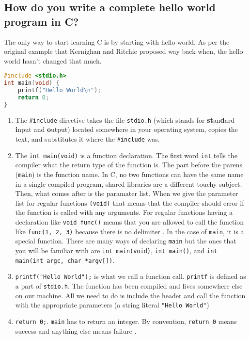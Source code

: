 \subsection{How do you write a complete hello world program in
C?}\label{how-do-you-write-a-complete-hello-world-program-in-c}

The only way to start learning C is by starting with hello world. As per the original example that Kernighan and Ritchie proposed way back when, the hello world hasn't changed that much.

\begin{lstlisting}[language=C]
#include <stdio.h>
int main(void) { 
    printf("Hello World\n");
    return 0; 
}
\end{lstlisting}

\begin{enumerate}
  \item The \texttt{\#include} directive takes the file \texttt{stdio.h} (which stands for \textbf{st}an\textbf{d}ard \textbf{i}nput and \textbf{o}utput) located somewhere in your operating system, copies the text, and substitutes it where the \texttt{\#include} was.
  \item The \texttt{int main(void)} is a function declaration. The first word \texttt{int} tells the compiler what the return type of the function is. The part before the parens (\texttt{main}) is the function name. In C, no two functions can have the same name in a single compiled program, shared libraries are a different touchy subject. Then, what comes after is the paramater list. When we give the parameter list for regular functions \texttt{(void)} that means that the compiler should error if the function is called with any arguments. For regular functions having a declaration like \texttt{void func()} means that you are allowed to call the function like \texttt{func(1, 2, 3)} because there is no delimiter \cite{CITATION_NEEDED}. In the case of \texttt{main}, it is a special function. There are many ways of declaring \texttt{main} but the ones that you will be familiar with are \texttt{int main(void)}, \texttt{int main()}, and \texttt{int main(int argc, char *argv[])}.
  \item \texttt{printf("Hello World\n");} is what we call a function call. \texttt{printf} is defined as a part of \texttt{stdio.h}. The function has been compiled and lives somewhere else on our machine. All we need to do is include the header and call the function with the appropriate parameters (a string literal \texttt{"Hello World\n"})
  \item \texttt{return 0;}. \texttt{main} has to return an integer. By convention, \texttt{return 0} means success and anything else means failure \cite{CITATION_NEEDED}.
\end{enumerate}


